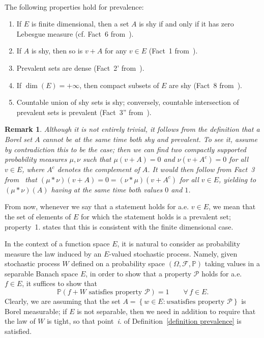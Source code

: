 \documentclass[10pt]{article}
\newcommand{\tmtextit}[1]{{\itshape{#1}}}
\newtheorem{remark}[theorem]{Remark}
\begin{document}
\

The following properties hold for prevalence:
\begin{enumerate}
  \item[1.] If $E$ is finite dimensional, then a set $A$ is shy if and only if it
  has zero Lebesgue measure (cf. Fact~6 from~{\cite{huntsauer}}).
  
  \item[2.] If $A$ is shy, then so is $v + A$ for any $v \in E$ (Fact~1
  from~{\cite{huntsauer}}).
  
  \item[3.] Prevalent sets are dense (Fact~2' from~{\cite{huntsauer}}).
  
  \item[4.] If $\dim (E) = + \infty$, then compact subsets of $E$ are shy (Fact~8
  from~{\cite{huntsauer}}).
  
  \item[5.] Countable union of shy sets is shy; conversely, countable intersection
  of prevalent sets is prevalent (Fact~3'' from~{\cite{huntsauer}}).
\end{enumerate}
\begin{remark}
  \label{rem:prevalence-consistent}Although it is not entirely trivial, it
  follows from the definition that a Borel set $A$ cannot be at the same time
  both shy and prevalent. To see it, assume by contradiction this to be the
  case; then we can find two compactly supported probability measures $\mu,
  \nu$ such that $\mu (v + A) = 0$ and $\nu (v + A^c) = 0$ for all $v \in E$,
  where $A^c$ denotes the complement of $A$. It would then follow from Fact~3
  from~{\cite{huntsauer}} that $(\mu \ast \nu) (v + A) = 0 = (\nu \ast \mu) (v
  + A^c)$ for all $v \in E$, yielding to $(\mu \ast \nu) (A)$ having at the
  same time both values $0$ and $1$.
\end{remark}

From now, whenever we say that a statement holds for a.e. $v \in E$, we mean
that the set of elements of $E$ for which the statement holds is a prevalent
set; property~1. states that this is consistent with the finite dimensional
case.

In the context of a function space $E$, it is natural to consider as
probability measure the law induced by an $E$\mbox{-}valued stochastic
process. Namely, given stochastic process $W$ defined on a probability space
$(\Omega, \mathcal{F}, \mathbb{P})$ taking values in a separable Banach space
$E$, in order to show that a property $\mathcal{P}$ holds for a.e. $f \in E$,
it suffices to show that
\[ \mathbb{P} \left( \text{$f + W$ satisfies property $\mathcal{P}$} \right) =
   1 \qquad \forall \, f \in E. \]
Clearly, we are assuming that the set $A = \left\{ w \in E : \text{$w$
satisfies property $\mathcal{P}$} \right\}$ is Borel measurable; if $E$ is not
separable, then we need in addition to require that the law of $W$ is tight,
so that point~\tmtextit{i.} of Definition~\ref{definition prevalence} is
satisfied.
\end{document}
